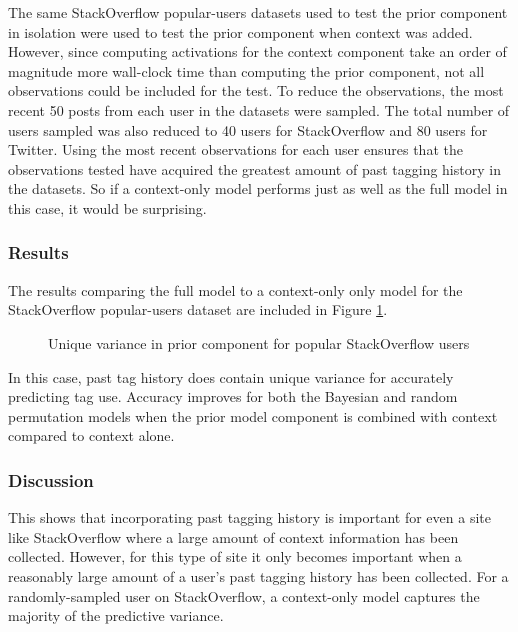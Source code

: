 \documentclass[man,floatsintext,donotrepeattitle]{apa6}
\begin{document}
The same StackOverflow popular-users datasets used to test the prior component in isolation were used to test the prior component when context was added.
However, since computing activations for the context component take an order of magnitude more wall-clock time than computing the prior component, not all observations could be included for the test.
To reduce the observations, the most recent 50 posts from each user in the datasets were sampled.
The total number of users sampled was also reduced to 40 users for StackOverflow and 80 users for Twitter.
Using the most recent observations for each user ensures that the observations tested have acquired the greatest amount of past tagging history in the datasets.
So if a context-only model performs just as well as the full model in this case, it would be surprising.

\subsubsection{Results}

The results comparing the full model to a context-only only model for the StackOverflow popular-users dataset are included in Figure \ref{figPUAddPrior}.

\begin{figure}[!htbp]
  \caption{Unique variance in prior component for popular StackOverflow users}
  \label{figPUAddPrior}
\end{figure}

In this case, past tag history does contain unique variance for accurately predicting tag use.
Accuracy improves for both the Bayesian and random permutation models when the prior model component is combined with context compared to context alone.

\subsubsection{Discussion}

This shows that incorporating past tagging history is important for even a site like StackOverflow where a large amount of context information has been collected.
However, for this type of site it only becomes important when a reasonably large amount of a user's past tagging history has been collected.
For a randomly-sampled user on StackOverflow, a context-only model captures the majority of the predictive variance.
\end{document}

